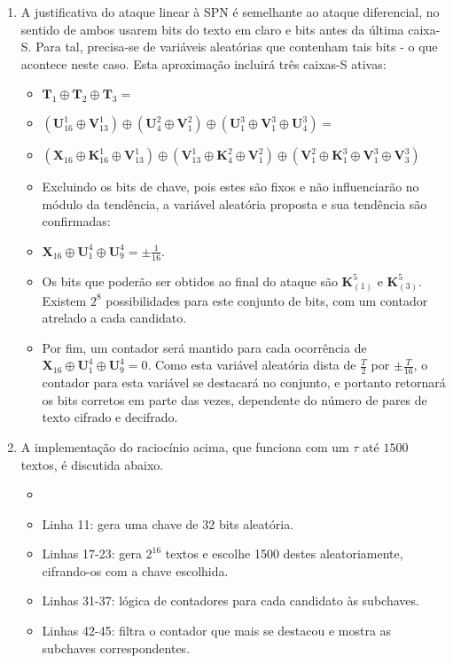 \documentclass{article}
\begin{document}
\begin{enumerate}
\item A justificativa do ataque linear à SPN é semelhante ao ataque diferencial, no sentido de ambos usarem bits do texto em claro e bits antes da última caixa-S. Para tal, precisa-se de variáveis aleatórias que contenham tais bits - o que acontece neste caso. Esta aproximação incluirá três caixas-S ativas:
\begin{itemize}
\item $\textbf{T}_{1} \oplus \textbf{T}_{2} \oplus \textbf{T}_{3} =$
\item $(\textbf{U}^{1}_{16} \oplus \textbf{V}^{1}_{13}) \oplus (\textbf{U}^{2}_{4} \oplus \textbf{V}^{2}_{1}) \oplus (\textbf{U}^{3}_{1} \oplus \textbf{V}^{3}_{1} \oplus \textbf{U}^{3}_{4}) =$
\item $(\textbf{X}_{16} \oplus \textbf{K}^{1}_{16} \oplus \textbf{V}^{1}_{13}) \oplus (\textbf{V}^{1}_{13} \oplus \textbf{K}^{2}_{4} \oplus \textbf{V}^{2}_{1}) \oplus (\textbf{V}^{2}_{1} \oplus \textbf{K}^{3}_{1} \oplus \textbf{V}^{3}_{1} \oplus \textbf{V}^{3}_{3})$
\item Excluindo os bits de chave, pois estes são fixos e não influenciarão no módulo da tendência, a variável aleatória proposta e sua tendência são confirmadas:
\item $\textbf{X}_{16} \oplus \textbf{U}^{4}_{1} \oplus \textbf{U}^{4}_{9} = \pm \frac{1}{16}$.
\item Os bits que poderão ser obtidos ao final do ataque são $\textbf{K}^{5}_{(1)}$ e $\textbf{K}^{5}_{(3)}$. Existem $2^{8}$ possibilidades para este conjunto de bits, com um contador atrelado a cada candidato.
\item Por fim, um contador será mantido para cada ocorrência de $\textbf{X}_{16} \oplus \textbf{U}^{4}_{1} \oplus \textbf{U}^{4}_{9} = 0$. Como esta variável aleatória dista de $\frac{T}{2}$ por $\pm\frac{T}{16}$, o contador para esta variável se destacará no conjunto, e portanto retornará os bits corretos em parte das vezes, dependente do número de pares de texto cifrado e decifrado.
\end{itemize}
\item A implementação do raciocínio acima, que funciona com um $\tau$ até $1500$ textos, é discutida abaixo.
\begin{itemize}
\item 
\item Linha 11: gera uma chave de 32 bits aleatória.
\item Linhas 17-23: gera $2^{16}$ textos e escolhe 1500 destes aleatoriamente, cifrando-os com a chave escolhida.
\item Linhas 31-37: lógica de contadores para cada candidato às subchaves.
\item Linhas 42-45: filtra o contador que mais se destacou e mostra as subchaves correspondentes.
\end{itemize} 
\end{enumerate}
\end{document}
